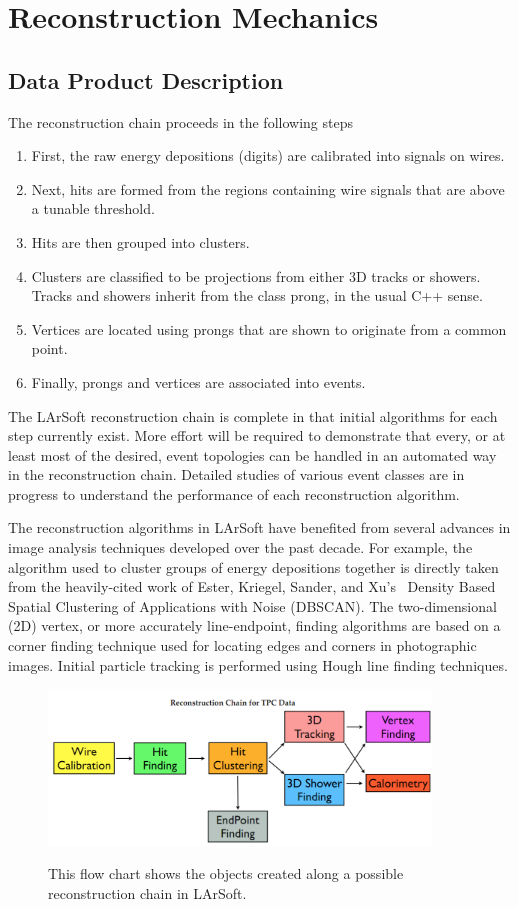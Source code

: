 \documentclass[12pt]{elsarticle}
\begin{document}
\section{Reconstruction Mechanics}
\subsection{Data Product Description}
The reconstruction chain proceeds in the following steps
\begin{enumerate}
\item First, the raw energy depositions (digits) are calibrated into signals on wires.
\item Next, hits are formed from the regions containing wire signals that are above a tunable threshold.
\item Hits are then grouped into clusters.
\item Clusters are classified to be projections from either 3D tracks or showers. Tracks and showers inherit from the class prong, in the usual C++ sense.
\item Vertices are located using prongs that are shown to originate from a common point.
\item Finally, prongs and vertices are associated into events.
\end{enumerate}
The LArSoft reconstruction chain is complete in that initial algorithms for each step currently exist.  More effort will be required to demonstrate that every, or at least most of the desired, event topologies can be handled in an automated way in the reconstruction chain. Detailed studies of various event classes are in progress to understand the performance of each reconstruction algorithm.

The reconstruction algorithms in LArSoft have benefited from several advances in image analysis techniques developed over the past decade.  For example, the algorithm used to cluster groups of energy depositions together is directly taken from the heavily-cited work of Ester, Kriegel, Sander, and Xu's~\cite{ester} Density Based Spatial Clustering of Applications with Noise (DBSCAN). The two-dimensional (2D) vertex, or more accurately line-endpoint, finding algorithms are based on a corner finding technique used for locating edges and corners in photographic images.  Initial particle tracking is performed using Hough line finding techniques.

\hspace*{2cm}
\begin{figure}[h]
\centering
\caption{This flow chart shows the objects created along a possible reconstruction chain in LArSoft.}
\includegraphics[width=4.0in]{./imgs/LArSoft-Recon-Flow-Soderberg.png}
\label{flow}
\end{figure}
\end{document}

